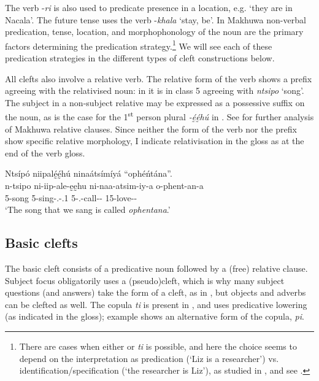 \documentclass[output=paper]{langscibook}
\begin{document}
\z

The verb \nobreakdash-\textit{ri} is also used to predicate presence in a location, e.g. ‘they are in Nacala’. The future tense uses the verb \nobreakdash-\textit{khala} ‘stay, be’. In Makhuwa non-verbal predication, tense, location, and morphophonology of the noun are the primary factors determining the predication strategy.\footnote{There are cases when either \PRL{} or \textit{ti} is possible, and here the choice seems to depend on the interpretation as predication (‘Liz is a researcher’) vs. identification/specification (‘the researcher is Liz’), as studied in \citet{Kujath2022}, and see \citet{KujathvanderWal2023}.} We will see each of these predication strategies in the different types of cleft constructions below.

  All clefts also involve a relative verb. The relative form of the verb shows a prefix agreeing with the relativised noun: in  it is in class 5 agreeing with \textit{ntsipo} ‘song’. The subject in a non-subject relative may be expressed as a possessive suffix on the noun, as is the case for the 1\textsuperscript{st} person plural \textit{\nobreakdash-ḛ́ḛ́hú} in . See \citet{vanderWal2010a} for further analysis of Makhuwa relative clauses. Since neither the form of the verb nor the prefix show specific relative morphology, I indicate relativisation in the gloss as \REL{} at the end of the verb gloss.

\ea
\label{bkm:Ref129266812}
Ntsípó niipalḛ́ḛ́hú ninaátsímíyá “ophéńtána”.\\
\gll
n-tsipo  ni{}-iip-ale-ḛḛhu  ni-naa-atsim-iy-a  o-phent-an-a\\
5-song  5{}-sing-\PFV{}.\REL{}-\POSS{}.1\PL{}  5\SM{}-\PRS{}.\DJ{}-{}call-\PASS{}-\FV{}  15-love-\RECP{}-\FV{}\\
\glt
‘The song that we sang is called \textit{ophentana}.’\\


\z
\subsection{Basic clefts}

The basic cleft consists of a predicative noun followed by a (free) relative clause. Subject focus obligatorily uses a (pseudo)cleft, which is why many subject questions (and answers) take the form of a cleft, as in , but objects  and adverbs  can be clefted as well. The copula \textit{ti} is present in , and  uses predicative lowering (as indicated in the gloss); example  shows an alternative form of the copula, \textit{pi}.
\end{document}

